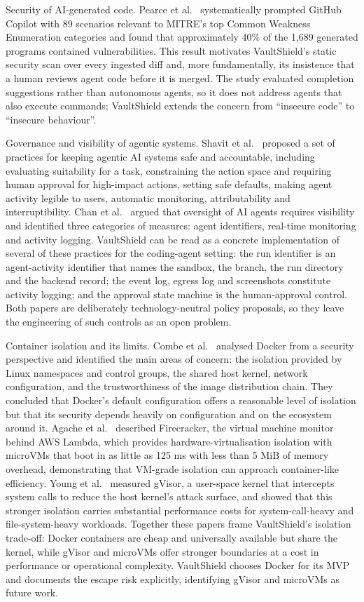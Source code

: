 \documentclass[12pt,a4paper,oneside]{report}
\begin{document}
Security of AI-generated code. Pearce et al.~\cite{ref8} systematically prompted GitHub Copilot with 89 scenarios relevant to MITRE's top Common Weakness Enumeration categories and found that approximately 40\% of the 1,689 generated programs contained vulnerabilities. This result motivates VaultShield's static security scan over every ingested diff and, more fundamentally, its insistence that a human reviews agent code before it is merged. The study evaluated completion suggestions rather than autonomous agents, so it does not address agents that also execute commands; VaultShield extends the concern from ``insecure code'' to ``insecure behaviour''.

Governance and visibility of agentic systems. Shavit et al.~\cite{ref9} proposed a set of practices for keeping agentic AI systems safe and accountable, including evaluating suitability for a task, constraining the action space and requiring human approval for high-impact actions, setting safe defaults, making agent activity legible to users, automatic monitoring, attributability and interruptibility. Chan et al.~\cite{ref10} argued that oversight of AI agents requires visibility and identified three categories of measures: agent identifiers, real-time monitoring and activity logging. VaultShield can be read as a concrete implementation of several of these practices for the coding-agent setting: the run identifier is an agent-activity identifier that names the sandbox, the branch, the run directory and the backend record; the event log, egress log and screenshots constitute activity logging; and the approval state machine is the human-approval control. Both papers are deliberately technology-neutral policy proposals, so they leave the engineering of such controls as an open problem.

Container isolation and its limits. Combe et al.~\cite{ref11} analysed Docker from a security perspective and identified the main areas of concern: the isolation provided by Linux namespaces and control groups, the shared host kernel, network configuration, and the trustworthiness of the image distribution chain. They concluded that Docker's default configuration offers a reasonable level of isolation but that its security depends heavily on configuration and on the ecosystem around it. Agache et al.~\cite{ref12} described Firecracker, the virtual machine monitor behind AWS Lambda, which provides hardware-virtualisation isolation with microVMs that boot in as little as 125 ms with less than 5 MiB of memory overhead, demonstrating that VM-grade isolation can approach container-like efficiency. Young et al.~\cite{ref13} measured gVisor, a user-space kernel that intercepts system calls to reduce the host kernel's attack surface, and showed that this stronger isolation carries substantial performance costs for system-call-heavy and file-system-heavy workloads. Together these papers frame VaultShield's isolation trade-off: Docker containers are cheap and universally available but share the kernel, while gVisor and microVMs offer stronger boundaries at a cost in performance or operational complexity. VaultShield chooses Docker for its MVP and documents the escape risk explicitly, identifying gVisor and microVMs as future work.
\end{document}
